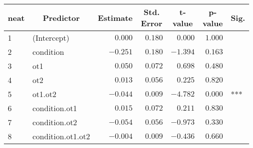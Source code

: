 \begin{table}[!tbp]
\begin{center}
\begin{tabular}{llrrrrl}
\hline\hline
\multicolumn{1}{l}{neat}&\multicolumn{1}{c}{Predictor}&\multicolumn{1}{c}{Estimate}&\multicolumn{1}{c}{Std. Error}&\multicolumn{1}{c}{t-value}&\multicolumn{1}{c}{p-value}&\multicolumn{1}{c}{Sig.}\tabularnewline
\hline
1&(Intercept)&$ 0.000$&$0.180$&$ 0.000$&$1.000$& \tabularnewline
2&condition&$-0.251$&$0.180$&$-1.394$&$0.163$& \tabularnewline
3&ot1&$ 0.050$&$0.072$&$ 0.698$&$0.480$& \tabularnewline
4&ot2&$ 0.013$&$0.056$&$ 0.225$&$0.820$& \tabularnewline
5&ot1.ot2&$-0.044$&$0.009$&$-4.782$&$0.000$&***\tabularnewline
6&condition.ot1&$ 0.015$&$0.072$&$ 0.211$&$0.830$& \tabularnewline
7&condition.ot2&$-0.054$&$0.056$&$-0.973$&$0.330$& \tabularnewline
8&condition.ot1.ot2&$-0.004$&$0.009$&$-0.436$&$0.660$& \tabularnewline
\hline
\end{tabular}\end{center}
\end{table}
